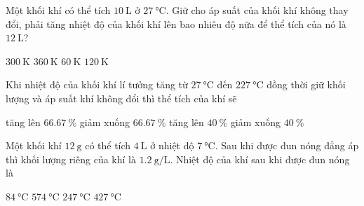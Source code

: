 \begin{ex}
Một khối khí có thể tích $\SI{10}{\liter}$ ở $\SI{27}{\celsius}$. Giữ cho áp suất của khối khí không thay đổi, phải tăng nhiệt độ của khối khí lên bao nhiêu độ nữa để thể tích của nó là $\SI{12}{\liter}$?
	
	\choice
	{$\SI{300}{\kelvin}$}
	{$\SI{360}{\kelvin}$}
	{\True $\SI{60}{\kelvin}$}
	{$\SI{120}{\kelvin}$}
\end{ex}
\begin{ex}
Khi nhiệt độ của khối khí lí tưởng tăng từ $\SI{27}{\celsius}$ đến $\SI{227}{\celsius}$ đồng thời giữ khối lượng và áp suất khí không đổi thì thể tích của khí sẽ
	
	\choice
	{\True tăng lên $\SI{66.67}{\percent}$}
	{giảm xuống $\SI{66.67}{\percent}$}
	{tăng lên $\SI{40}{\percent}$}
	{giảm xuống $\SI{40}{\percent}$}
\end{ex}
\begin{ex}
	Một khối khí $\SI{12}{\gram}$ có thể tích $\SI{4}{\liter}$ ở nhiệt độ $\SI{7}{\celsius}$. Sau khi được đun nóng đẳng áp thì khối lượng riêng của khí là $\SI{1.2}{\gram/\liter}$. Nhiệt độ của khí sau khi được đun nóng là
	
	\choice
	{$\SI{84}{\celsius}$}
	{$\SI{574}{\celsius}$}
	{$\SI{247}{\celsius}$}
	{\True $\SI{427}{\celsius}$}
\end{ex}
